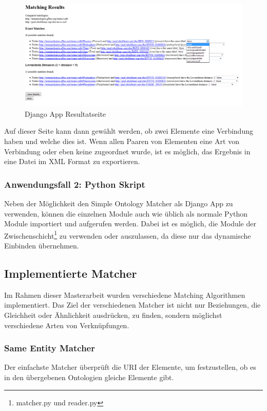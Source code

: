 		\begin{figure}[ht]
		\centering
		\includegraphics[width=1.0\textwidth]{pics/TemplateMatchingResultPage.png}
		\caption{Django App Resultatseite}
		\label{fig5}
		\end{figure}
		Auf dieser Seite kann dann gewählt werden, ob zwei Elemente eine Verbindung
		haben und welche dies ist. Wenn allen Paaren von Elementen eine Art von
		Verbindung oder eben keine zugeordnet wurde, ist es möglich, das Ergebnis in
		eine Datei im XML Format zu exportieren.
		
		\subsubsection{Anwendungsfall 2: Python Skript}
		Neben der Möglichkeit den Simple Ontology Matcher als Django App zu verwenden,
		können die einzelnen Module auch wie üblich als normale Python Module
		importiert und aufgerufen werden. Dabei ist es möglich, die Module der
		Zwischenschicht\footnote{matcher.py und reader.py} zu verwenden oder
		auszulassen, da diese nur das dynamische Einbinden übernehmen.
		
		\subsection{Implementierte Matcher}
		Im Rahmen dieser Masterarbeit wurden verschiedene Matching Algorithmen
		implementiert. Das Ziel der verschiedenen Matcher ist nicht nur Beziehungen,
		die Gleichheit oder Ähnlichkeit ausdrücken, zu finden, sondern möglichst
		verschiedene Arten von Verknüpfungen.
		
		\subsubsection{Same Entity Matcher}
		Der einfachste Matcher überprüft die URI der Elemente, um festzustellen, ob es
		in den übergebenen Ontologien gleiche Elemente gibt.
		
